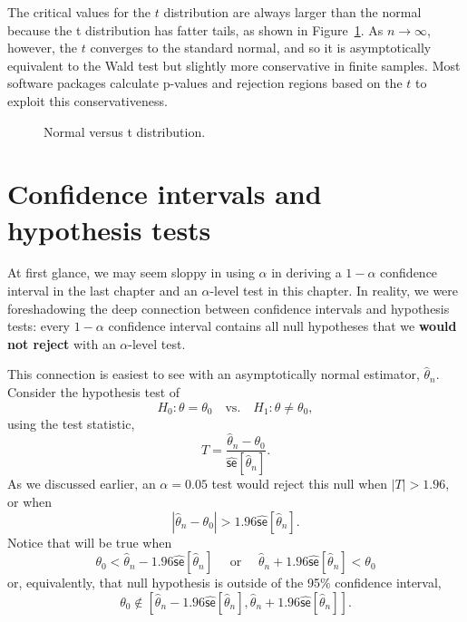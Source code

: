 \documentclass[
  13pt,
  letterpaper,
  DIV=11,
  numbers=noendperiod]{scrreprt}
\newcommand{\se}{\textsf{se}}
\theoremstyle{plain}
\theoremstyle{definition}
\theoremstyle{definition}
\theoremstyle{remark}
\begin{document}
The critical values for the \(t\) distribution are always larger than
the normal because the t distribution has fatter tails, as shown in
Figure~\ref{fig-shape-of-t}. As \(n\to\infty\), however, the \(t\)
converges to the standard normal, and so it is asymptotically equivalent
to the Wald test but slightly more conservative in finite samples. Most
software packages calculate p-values and rejection regions based on the
\(t\) to exploit this conservativeness.

\begin{figure}[th]


\caption{\label{fig-shape-of-t}Normal versus t distribution.}

\end{figure}%

\section{Confidence intervals and hypothesis
tests}\label{confidence-intervals-and-hypothesis-tests}

At first glance, we may seem sloppy in using \(\alpha\) in deriving a
\(1 - \alpha\) confidence interval in the last chapter and an
\(\alpha\)-level test in this chapter. In reality, we were foreshadowing
the deep connection between confidence intervals and hypothesis tests:
every \(1-\alpha\) confidence interval contains all null hypotheses that
we \textbf{would not reject} with an \(\alpha\)-level test.

This connection is easiest to see with an asymptotically normal
estimator, \(\widehat{\theta}_n\). Consider the hypothesis test of \[ 
H_0: \theta = \theta_0 \quad \text{vs.}\quad H_1: \theta \neq \theta_0,
\] using the test statistic, \[ 
T = \frac{\widehat{\theta}_{n} - \theta_{0}}{\widehat{\se}[\widehat{\theta}_{n}]}. 
\] As we discussed earlier, an \(\alpha = 0.05\) test would reject this
null when \(|T| > 1.96\), or when \[ 
|\widehat{\theta}_{n} - \theta_{0}| > 1.96 \widehat{\se}[\widehat{\theta}_{n}]. 
\] Notice that will be true when \[ 
\theta_{0} < \widehat{\theta}_{n} - 1.96\widehat{\se}[\widehat{\theta}_{n}]\quad \text{ or }\quad \widehat{\theta}_{n} + 1.96\widehat{\se}[\widehat{\theta}_{n}] < \theta_{0}
\] or, equivalently, that null hypothesis is outside of the 95\%
confidence interval,
\[\theta_0 \notin \left[\widehat{\theta}_{n} - 1.96\widehat{\se}[\widehat{\theta}_{n}], \widehat{\theta}_{n} + 1.96\widehat{\se}[\widehat{\theta}_{n}]\right].\]
\end{document}
